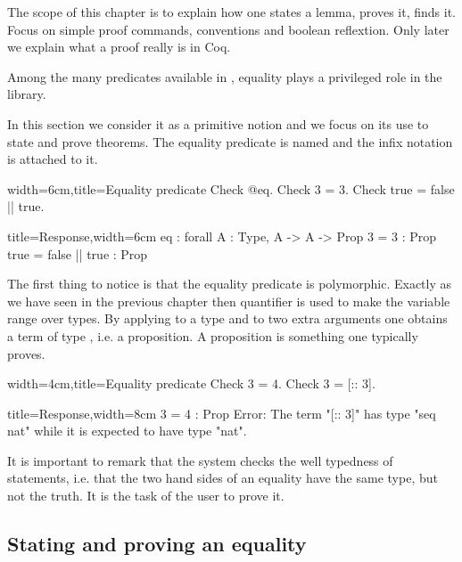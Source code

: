 
The scope of this chapter is to explain how one states a lemma,
proves it, finds it.  Focus on simple proof commands, conventions
and boolean reflextion.  Only later we explain what a proof really is
in Coq.

\mcbREQUIRE{}

Among the many predicates available in \Coq{},
equality plays a privileged role in the \mcbMC{} library.

In this section we consider it as a primitive notion and we focus on its use to
state and prove theorems.  The equality predicate is named  and
the infix notation \C{=} is attached to it.

\begin{coq}{width=6cm,title=Equality predicate}
Check @eq.
Check 3 = 3.
Check true = false || true.
\end{coq}
\begin{coqout}{title=Response,width=6cm}
eq : forall A : Type, A -> A -> Prop
3 = 3 : Prop
true = false || true : Prop
\end{coqout}

The first thing to notice is that the equality predicate is polymorphic.
Exactly as we have seen in the previous chapter then  quantifier
is used to make the variable  range over types.  By applying  
 to a type and to two extra arguments one obtains a term
of type , i.e. a proposition.  A proposition is something
one typically proves.

\begin{coq}{width=4cm,title=Equality predicate}
Check 3 = 4.
Check 3 = [:: 3].
$~$
\end{coq}
\begin{coqout}{title=Response,width=8cm}
3 = 4 : Prop
Error: The term "[:: 3]" has type "seq nat"
 while it is expected to have type "nat".
\end{coqout}

It is important to remark that the \Coq{} system checks the well typedness of
statements, i.e. that the two hand sides of an equality have the same type, but
not the truth.  It is the task of the user to prove it.

\subsection{Stating and proving an equality}

